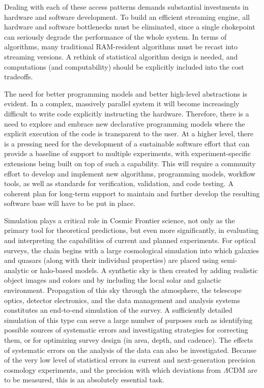 Dealing with each of these access patterns demands substantial
investments in hardware and software development. To build an
efficient streaming engine, all hardware and software bottlenecks must
be eliminated, since a single chokepoint can seriously degrade the
performance of the whole system. In terms of algorithms, many
traditional RAM-resident algorithms must be recast into streaming
versions. A rethink of statistical algorithm design is needed, and
computations (and computability) should be explicitly included into
the cost tradeoffs.

The need for better programming models and better high-level
abstractions is evident. In a complex, massively parallel system it
will become increasingly difficult to write code explicitly
instructing the hardware. Therefore, there is a need to explore and
embrace new declarative programming models where the explicit
execution of the code is transparent to the user. At a higher level,
there is a pressing need for the development of a sustainable software
effort that can provide a baseline of support to multiple experiments,
with experiment-specific extensions being built on top of such a
capability. This will require a community effort to develop and
implement new algorithms, programming models, workflow tools, as well
as standards for verification, validation, and code testing. A
coherent plan for long-term support to maintain and further develop
the resulting software base will have to be put in place.

Simulation plays a critical role in Cosmic Frontier science, not only
as the primary tool for theoretical predictions, but even more
significantly, in evaluating and interpreting the capabilities of
current and planned experiments. For optical surveys, the chain begins
with a large cosmological simulation into which galaxies and quasars
(along with their individual properties) are placed using
semi-analytic or halo-based models. A synthetic sky is then created by
adding realistic object images and colors and by including the local
solar and galactic environment. Propagation of this sky through the
atmosphere, the telescope optics, detector electronics, and the data
management and analysis systems constitutes an end-to-end simulation
of the survey. A sufficiently detailed simulation of this type can
serve a large number of purposes such as identifying possible sources
of systematic errors and investigating strategies for correcting them,
or for optimizing survey design (in area, depth, and cadence). The
effects of systematic errors on the analysis of the data can also be
investigated. Because of the very low level of statistical errors in
current and next-generation precision cosmology experiments, and the
precision with which deviations from $\Lambda$CDM are to be measured,
this is an absolutely essential task.

